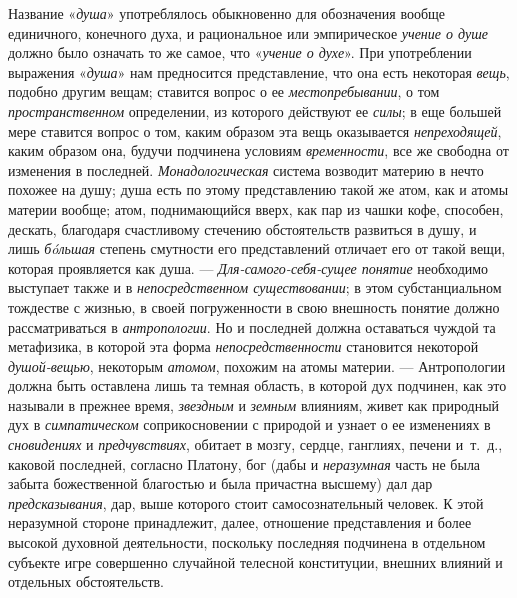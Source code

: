 \documentclass[twoside]{article}
\begin{document}
{Название «{\em душа}»
употреблялось обыкновенно для обозначения
вообще единичного, конечного духа, и рациональное или эмпирическое
{\em учение о душе}
должно было означать то же самое, что
«{\em учение о духе}».
При употреблении выражения
«{\em душа}» нам
предносится представление, что она есть некоторая
{\em вещь}, подобно
другим вещам; ставится вопрос о ее
{\em местопребывании}, о
том {\em пространственном}
определении, из которого действуют ее
{\em силы}; в еще большей
мере ставится вопрос о том, каким образом эта вещь оказывается
{\em непреходящей}, каким
образом она, будучи подчинена условиям
{\em временности}, все же
свободна от изменения в последней.
{\em Монадологическая}
система возводит материю в нечто похожее на душу; душа есть
по этому представлению такой же атом, как и атомы материи вообще; атом,
поднимающийся вверх, как пар из чашки кофе, способен, дескать, благодаря
счастливому стечению обстоятельств развиться в душу, и лишь
{\em бóльшая} степень
смутности его представлений отличает его от такой вещи, которая проявляется
как душа. — {\em Для-самого-себя-сущее
понятие} необходимо выступает также и в
{\em непосредственном существовании};
в этом субстанциальном тождестве с жизнью, в своей
погруженности в свою внешность понятие должно рассматриваться в
{\em антропологии}. Но и
последней должна оставаться чуждой та метафизика, в которой эта форма
{\em непосредственности}
становится некоторой
{\em душой-вещью},
некоторым {\em атомом},
похожим на атомы материи. — Антропологии
должна быть оставлена лишь та темная область, в которой дух подчинен, как
это называли в прежнее время,
{\em звездным} и
{\em земным} влияниям,
живет как природный дух в
{\em симпатическом}
соприкосновении с природой и узнает о ее изменениях в
{\em сновидениях} и
{\em предчувствиях},
обитает в мозгу, сердце, ганглиях, печени и~т.~д., каковой
последней, согласно Платону, бог (дабы и
{\em неразумная} часть не
была забыта божественной благостью и была причастна высшему) дал дар
{\em предсказывания},
дар, выше которого стоит самосознательный человек. К этой
неразумной стороне принадлежит, далее, отношение
представления и более высокой духовной деятельности, поскольку последняя
подчинена в отдельном субъекте игре совершенно случайной телесной
конституции, внешних влияний и отдельных обстоятельств.

}
\end{document}
